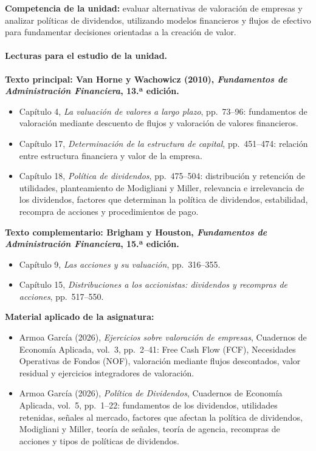 \documentclass[12pt,a4paper]{article}
\begin{document}
\textbf{Competencia de la unidad:} evaluar alternativas de valoración de
empresas y analizar políticas de dividendos, utilizando modelos financieros
y flujos de efectivo para fundamentar decisiones orientadas a la creación
de valor.

\paragraph{Lecturas para el estudio de la unidad.}

\textbf{Texto principal: Van Horne y Wachowicz (2010),
\textit{Fundamentos de Administración Financiera}, 13.ª edición.}

\begin{itemize}
    \item Capítulo 4, \textit{La valuación de valores a largo plazo},
    pp.~73--96: fundamentos de valoración mediante descuento de flujos
    y valoración de valores financieros.

    \item Capítulo 17, \textit{Determinación de la estructura de capital},
    pp.~451--474: relación entre estructura financiera y valor de la
    empresa.

    \item Capítulo 18, \textit{Política de dividendos},
    pp.~475--504: distribución y retención de utilidades, planteamiento
    de Modigliani y Miller, relevancia e irrelevancia de los dividendos,
    factores que determinan la política de dividendos, estabilidad,
    recompra de acciones y procedimientos de pago.
\end{itemize}

\noindent
\textbf{Texto complementario: Brigham y Houston,
\textit{Fundamentos de Administración Financiera}, 15.ª edición.}

\begin{itemize}
    \item Capítulo 9, \textit{Las acciones y su valuación},
    pp.~316--355.
    \item Capítulo 15, \textit{Distribuciones a los accionistas:
    dividendos y recompras de acciones},
    pp.~517--550.
\end{itemize}

\noindent
\textbf{Material aplicado de la asignatura:}

\begin{itemize}
    \item Armoa García (2026), \textit{Ejercicios sobre valoración de
    empresas}, Cuadernos de Economía Aplicada, vol.~3,
    pp.~2--41: Free Cash Flow (FCF), Necesidades Operativas de Fondos
    (NOF), valoración mediante flujos descontados, valor residual y
    ejercicios integradores de valoración.

    \item Armoa García (2026), \textit{Política de Dividendos},
    Cuadernos de Economía Aplicada, vol.~5,
    pp.~1--22: fundamentos de los dividendos, utilidades retenidas,
    señales al mercado, factores que afectan la política de dividendos,
    Modigliani y Miller, teoría de señales, teoría de agencia, recompras
    de acciones y tipos de políticas de dividendos.
\end{itemize}
\end{document}
